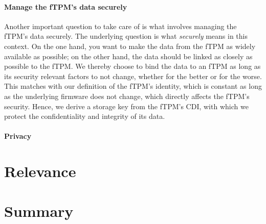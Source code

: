 \paragraph{Manage the fTPM's data securely}
Another important question to take care of is what involves managing the fTPM's data securely.
The underlying question is what \emph{securely} means in this context.
On the one hand, you want to make the data from the fTPM as widely available as possible; on the other hand, the data should be linked as closely as possible to the fTPM\@.
We thereby choose to bind the data to an fTPM as long as its security relevant factors to not change, whether for the better or for the worse.
This matches with our definition of the fTPM's identity, which is constant as long as the underlying firmware does not change, which directly affects the fTPM's security.
Hence, we derive a storage key from the fTPM's \ac{CDI}, with which we protect the confidentiality and integrity of its data.


\paragraph{Privacy}


\section{Relevance}

\section{Summary}

